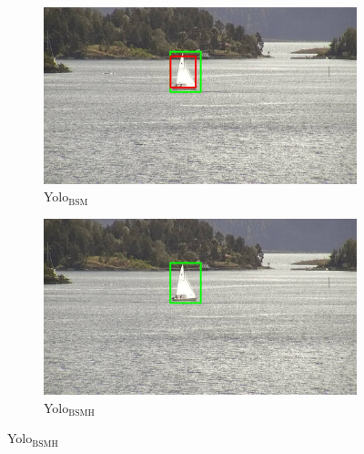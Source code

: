 \begin{figure}[h!]
\begin{subfigure}{.5\textwidth}
  \centering
  \includegraphics[width=0.9\linewidth]{results/case_buildings/yolo23/2better/yolo2/selected_08_04_frame1690.jpg}
  \caption{Yolo$_{\text{BSM}}$}
\end{subfigure}%
\begin{subfigure}{.5\textwidth}
  \centering
  \includegraphics[width=.9\linewidth]{results/case_buildings/yolo23/2better/yolo3/selected_08_04_frame1690.jpg}
  \caption{Yolo$_{\text{BSMH}}$}
\end{subfigure}


\end{figure}
